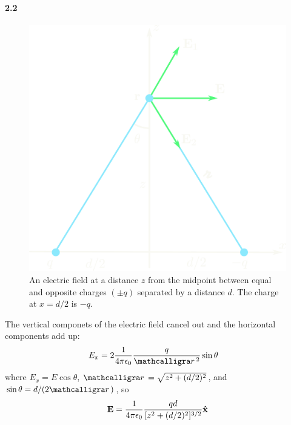 \documentclass[../main.tex]{subfiles}
\begin{document}
\paragraph{2.2}
\begin{figure}[ht]
    \centering
    \includegraphics[width=0.5\linewidth]{images/fig2_2.png}
    \captionsetup{width=0.8\linewidth}
    \caption{An electric field at a distance $z$ from the midpoint between equal and opposite
    charges $(\pm q)$ separated by a distance $d$. The charge at $x = d/2$ is $-q$.}
    \label{fig:2_2}
\end{figure}
The vertical componets of the electric field cancel out and the horizontal components add up:
\begin{align*}
    E_x &= 2 \frac{1}{4\pi\epsilon_0} \frac{q}{\scriptr^2} \sin \theta
\end{align*}
where $E_x = E \cos \theta$, $\scriptr = \sqrt{z^2 + (d/2)^2}$, and $\sin \theta = d / (2\scriptr)$,
so 
\begin{align*}
    \vb{E} = \frac{1}{4\pi\epsilon_0} \frac{qd}{[z^2 + (d/2)^2]^{3/2}} \vu{x}
\end{align*}
\end{document}

